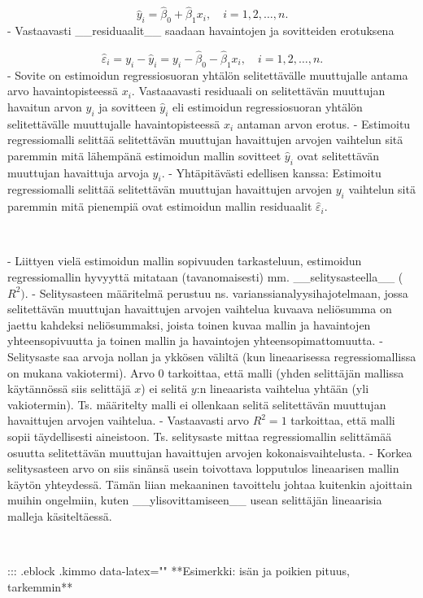 \documentclass[
]{book}
\begin{document}
\begin{itemize}
$$
\widehat{y}_i = \widehat{\beta}_0 + \widehat{\beta}_1 x_i, \quad i=1,2,\ldots,n.
$$
  - Vastaavasti __residuaalit__ saadaan havaintojen ja sovitteiden erotuksena

$$
\widehat{\varepsilon}_i = y_i - \widehat{y}_i = y_i - \widehat{\beta}_0 - \widehat{\beta}_1 x_i, \quad i=1,2,\ldots,n.
$$
- Sovite on estimoidun regressiosuoran yhtälön selitettävälle muuttujalle antama arvo havaintopisteessä $x_i$. Vastaaavasti residuaali on selitettävän muuttujan havaitun arvon $y_i$ ja sovitteen $\widehat{y}_i$ eli estimoidun regressiosuoran yhtälön selitettävälle muuttujalle  havaintopisteessä $x_i$ antaman arvon erotus.
  - Estimoitu regressiomalli selittää selitettävän muuttujan havaittujen arvojen vaihtelun sitä paremmin mitä lähempänä estimoidun mallin sovitteet $\widehat{y}_i$ ovat selitettävän muuttujan havaittuja arvoja $y_i$.
  - Yhtäpitävästi edellisen kanssa: Estimoitu regressiomalli selittää selitettävän muuttujan havaittujen arvojen $y_i$ vaihtelun sitä paremmin mitä pienempiä ovat estimoidun mallin residuaalit $\widehat{\varepsilon}_i$.

\
\

- Liittyen vielä estimoidun mallin sopivuuden tarkasteluun, estimoidun regressiomallin hyvyyttä mitataan (tavanomaisesti) mm. __selitysasteella__ ($R^2)$.
  - Selitysasteen määritelmä perustuu ns. varianssianalyysihajotelmaan, jossa selitettävän muuttujan havaittujen arvojen vaihtelua kuvaava neliösumma on jaettu kahdeksi neliösummaksi, joista toinen kuvaa mallin ja havaintojen yhteensopivuutta ja toinen mallin ja havaintojen yhteensopimattomuutta.
  - Selitysaste saa arvoja nollan ja ykkösen väliltä (kun lineaarisessa regressiomallissa on mukana vakiotermi). Arvo 0 tarkoittaa, että malli (yhden selittäjän mallissa käytännössä siis selittäjä $x$) ei selitä $y$:n lineaarista vaihtelua yhtään (yli vakiotermin). Ts. määritelty malli ei ollenkaan selitä selitettävän muuttujan havaittujen arvojen vaihtelua.
  - Vastaavasti arvo $R^2 = 1$ tarkoittaa, että malli sopii täydellisesti aineistoon. Ts. selitysaste mittaa regressiomallin selittämää osuutta selitettävän muuttujan havaittujen arvojen kokonaisvaihtelusta.
  - Korkea selitysasteen arvo on siis sinänsä usein toivottava lopputulos lineaarisen mallin käytön yhteydessä. Tämän liian mekaaninen tavoittelu johtaa kuitenkin ajoittain muihin ongelmiin, kuten __ylisovittamiseen__ usean selittäjän lineaarisia malleja käsiteltäessä.

\
\

::: {.eblock .kimmo data-latex="{}"}
**Esimerkki: isän ja poikien pituus, tarkemmin**


\end{itemize}
\end{document}
